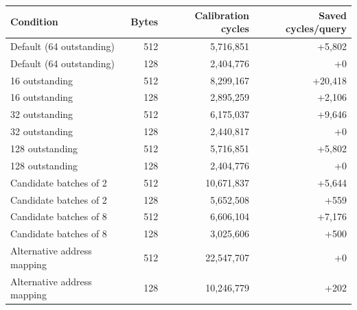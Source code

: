 \begin{tabular}{lrrr}
\toprule
Condition & Bytes & Calibration cycles & Saved cycles/query \\
\midrule
Default (64 outstanding) & 512 & 5,716,851 & +5,802 \\
Default (64 outstanding) & 128 & 2,404,776 & +0 \\
16 outstanding & 512 & 8,299,167 & +20,418 \\
16 outstanding & 128 & 2,895,259 & +2,106 \\
32 outstanding & 512 & 6,175,037 & +9,646 \\
32 outstanding & 128 & 2,440,817 & +0 \\
128 outstanding & 512 & 5,716,851 & +5,802 \\
128 outstanding & 128 & 2,404,776 & +0 \\
Candidate batches of 2 & 512 & 10,671,837 & +5,644 \\
Candidate batches of 2 & 128 & 5,652,508 & +559 \\
Candidate batches of 8 & 512 & 6,606,104 & +7,176 \\
Candidate batches of 8 & 128 & 3,025,606 & +500 \\
Alternative address mapping & 512 & 22,547,707 & +0 \\
Alternative address mapping & 128 & 10,246,779 & +202 \\
\bottomrule
\end{tabular}
